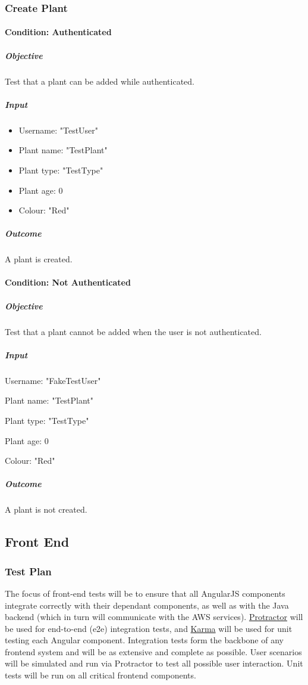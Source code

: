 \documentclass{article}
\begin{document}
		\subsubsection{Create Plant}
		
		\paragraph{Condition: Authenticated}
		\subparagraph{Objective}
		Test that a plant can be added while authenticated.
		
		\subparagraph{Input}
		\begin{itemize}
			\item Username: "TestUser"
			\item Plant name: "TestPlant"
			\item Plant type: "TestType"
			\item Plant age: 0
			\item Colour: "Red"
		\end{itemize}
		
		\subparagraph{Outcome}
		A plant is created.
		
		\paragraph{Condition: Not Authenticated}
		\subparagraph{Objective}
		Test that a plant cannot be added when the user is not authenticated.
		
		\subparagraph{Input}
		\item Username: "FakeTestUser"
		\item Plant name: "TestPlant"
		\item Plant type: "TestType"
		\item Plant age: 0
		\item Colour: "Red"
		
		\subparagraph{Outcome}
		A plant is not created.
		
		
	\subsection{Front End}
		\subsubsection{Test Plan}
		The focus of front-end tests will be to ensure that all AngularJS components integrate correctly with their dependant components, as well as with the Java backend (which in turn will communicate with the AWS services). \href{http://www.protractortest.org/#/}{Protractor} will be used for end-to-end (e2e) integration tests, and \href{https://karma-runner.github.io/1.0/index.html}{Karma} will be used for unit testing each Angular component. Integration tests form the backbone of any frontend system and will be as extensive and complete as possible. User scenarios will be simulated and run via Protractor to test all possible user interaction. Unit tests will be run on all critical frontend components.
		
\end{document}
